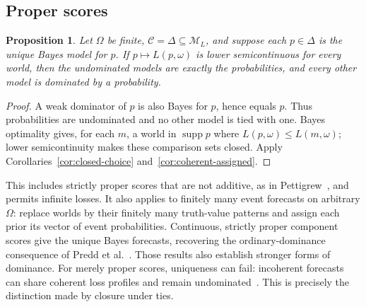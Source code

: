 \documentclass[11pt]{article}
\newtheorem{proposition}[theorem]{Proposition}
\theoremstyle{definition}
\newcommand{\M}{\mathcal M}
\newcommand{\C}{\mathcal C}
\newcommand{\supp}{\operatorname{supp}}
\begin{document}
\subsection{Proper scores}
\begin{proposition}\label{prop:short-proper}
Let $\Omega$ be finite, $\C=\Delta\subseteq\M_L$, and suppose each $p\in\Delta$ is the unique Bayes model for $p$. If $p\mapsto L(p,\omega)$ is lower semicontinuous for every world, then the undominated models are exactly the probabilities, and every other model is dominated by a probability.
\end{proposition}
\begin{proof}
A weak dominator of $p$ is also Bayes for $p$, hence equals $p$. Thus probabilities are undominated and no other model is tied with one. Bayes optimality gives, for each $m$, a world in $\supp p$ where $L(p,\omega)\le L(m,\omega)$; lower semicontinuity makes these comparison sets closed. Apply Corollaries~\ref{cor:closed-choice} and~\ref{cor:coherent-assigned}.
\end{proof}
This includes strictly proper scores that are not additive, as in Pettigrew~\cite{Pettigrew}, and permits infinite losses. It also applies to finitely many event forecasts on arbitrary $\Omega$: replace worlds by their finitely many truth-value patterns and assign each prior its vector of event probabilities. Continuous, strictly proper component scores give the unique Bayes forecasts, recovering the ordinary-dominance consequence of Predd et al.~\cite{Predd}. Those results also establish stronger forms of dominance. For merely proper scores, uniqueness can fail: incoherent forecasts can share coherent loss profiles and remain undominated~\cite{SSK09}. This is precisely the distinction made by closure under ties.
\end{document}
